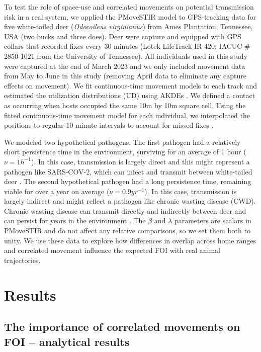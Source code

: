 \documentclass[letterpaper]{article}
\begin{document}
To test the role of space-use and correlated movements on potential transmission risk in a real system, we applied the PMoveSTIR model to GPS-tracking data for five white-tailed deer (\emph{Odocoileus virginianus}) from Ames Plantation, Tennessee, USA (two bucks and three does).%
Deer were capture and equipped with GPS collars that recorded fixes every 30 minutes (Lotek LifeTrack IR 420; IACUC \# 2850-1021 from the University of Tennessee).  All individuals used in this study were captured at the end of March 2023 and we only included movement data from May to June in this study (removing April data to eliminate any capture effects on movement).  We fit continuous-time movement models to each track and estimated the utilization distributions (UD) using AKDEs \citep{Calabrese2016}. We defined a contact as occurring when hosts occupied the same 10m by 10m square cell.  Using the fitted continuous-time movement model for each individual, we interpolated the positions to regular 10 minute intervals to account for missed fixes \citep{Yang2023}. 

We modeled two hypothetical pathogens. The first pathogen had a relatively short persistence time in the environment, surviving for an average of 1 hour  ($\nu=1 h^{-1}$). In this case, transmission is largely direct and this might represent a pathogen like SARS-COV-2, which can infect and transmit between white-tailed deer \citep{Hale2022}. The second hypothetical pathogen had a long persistence time, remaining viable for over a year on average ($\nu=0.9 yr^{-1}$). In this case, transmission is largely indirect and might reflect a pathogen like chronic wasting disease (CWD).  Chronic wasting disease can transmit directly and indirectly between deer and can persist for years in the environment \citep{Saunders2012a}. The $\beta$ and $\lambda$ parameters are scalars in PMoveSTIR and do not affect any relative comparisons, so we set them both to unity. 
We use these data to explore how differences in overlap across home ranges and  correlated movement influence the expected FOI with real animal trajectories.

\section*{Results}

\subsection*{The importance of correlated movements on FOI -- analytical results}
\end{document}
